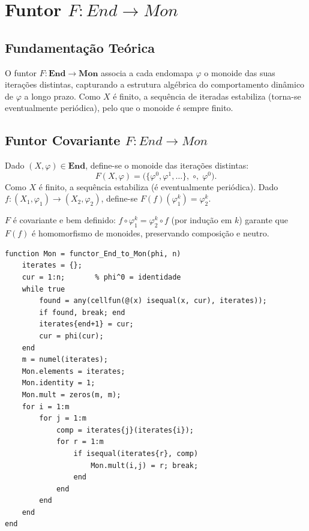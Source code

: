 \section{Funtor \texorpdfstring{$F: End \to Mon$}{F: End -> Mon}}
\label{sec:functor-end-mon}

\subsection{Fundamentação Teórica}

O funtor $F: \mathbf{End} \to \mathbf{Mon}$ associa a cada endomapa $\varphi$ o monoide das suas iterações distintas, capturando a estrutura algébrica do comportamento dinâmico de $\varphi$ a longo prazo. Como $X$ é finito, a sequência de iteradas estabiliza (torna-se eventualmente periódica), pelo que o monoide é sempre finito.

\subsection{Funtor Covariante \texorpdfstring{$F: End \to Mon$}{F: End -> Mon}}

\begin{definition}
Dado $(X, \varphi) \in \mathbf{End}$, define-se o monoide das iterações distintas:
\[
    F(X, \varphi) = \bigl(\{\varphi^0, \varphi^1, \ldots\},\;\circ,\;\varphi^0\bigr).
\]
Como $X$ é finito, a sequência estabiliza (é eventualmente periódica). Dado $f: (X_1, \varphi_1) \to (X_2, \varphi_2)$, define-se $F(f)(\varphi_1^k) = \varphi_2^k$.
\end{definition}

\begin{proposition}
$F$ é covariante e bem definido: $f \circ \varphi_1^k = \varphi_2^k \circ f$ (por indução em $k$) garante que $F(f)$ é homomorfismo de monoides, preservando composição e neutro.
\end{proposition}

\begin{lstlisting}[style=matlab, caption={Funtor covariante $F: \mathbf{End} \to \mathbf{Mon}$}]
function Mon = functor_End_to_Mon(phi, n)
    iterates = {};
    cur = 1:n;       % phi^0 = identidade
    while true
        found = any(cellfun(@(x) isequal(x, cur), iterates));
        if found, break; end
        iterates{end+1} = cur;
        cur = phi(cur);
    end
    m = numel(iterates);
    Mon.elements = iterates;
    Mon.identity = 1;
    Mon.mult = zeros(m, m);
    for i = 1:m
        for j = 1:m
            comp = iterates{j}(iterates{i});
            for r = 1:m
                if isequal(iterates{r}, comp)
                    Mon.mult(i,j) = r; break;
                end
            end
        end
    end
end
\end{lstlisting}

